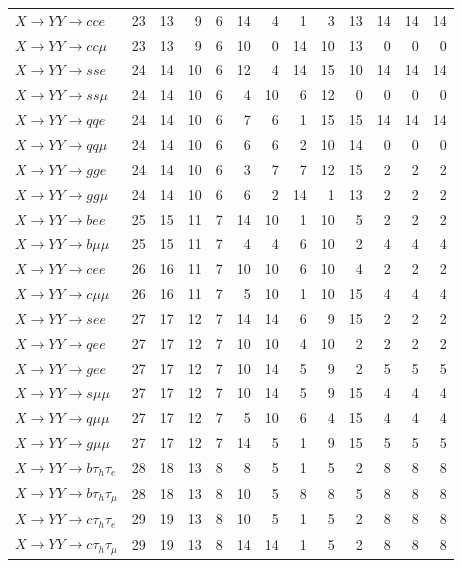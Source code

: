 {\begin{longtable}{l rrrrrrrrrrrr}
$X\to YY\to cce$ & 23 & 13 & 9 & 6 & 14 & 4 & 1 & 3 & 13 & 14 & 14 & 14 \\
$X\to YY\to cc\mu$ & 23 & 13 & 9 & 6 & 10 & 0 & 14 & 10 & 13 & 0 & 0 & 0 \\
$X\to YY\to sse$ & 24 & 14 & 10 & 6 & 12 & 4 & 14 & 15 & 10 & 14 & 14 & 14 \\
$X\to YY\to ss\mu$ & 24 & 14 & 10 & 6 & 4 & 10 & 6 & 12 & 0 & 0 & 0 & 0 \\
$X\to YY\to qqe$ & 24 & 14 & 10 & 6 & 7 & 6 & 1 & 15 & 15 & 14 & 14 & 14 \\
$X\to YY\to qq\mu$ & 24 & 14 & 10 & 6 & 6 & 6 & 2 & 10 & 14 & 0 & 0 & 0 \\
$X\to YY\to gge$ & 24 & 14 & 10 & 6 & 3 & 7 & 7 & 12 & 15 & 2 & 2 & 2 \\
$X\to YY\to gg\mu$ & 24 & 14 & 10 & 6 & 6 & 2 & 14 & 1 & 13 & 2 & 2 & 2 \\
\addlinespace[2pt]
$X\to YY\to bee$ & 25 & 15 & 11 & 7 & 14 & 10 & 1 & 10 & 5 & 2 & 2 & 2 \\
$X\to YY\to b\mu\mu$ & 25 & 15 & 11 & 7 & 4 & 4 & 6 & 10 & 2 & 4 & 4 & 4 \\
$X\to YY\to cee$ & 26 & 16 & 11 & 7 & 10 & 10 & 6 & 10 & 4 & 2 & 2 & 2 \\
$X\to YY\to c\mu\mu$ & 26 & 16 & 11 & 7 & 5 & 10 & 1 & 10 & 15 & 4 & 4 & 4 \\
$X\to YY\to see$ & 27 & 17 & 12 & 7 & 14 & 14 & 6 & 9 & 15 & 2 & 2 & 2 \\
$X\to YY\to qee$ & 27 & 17 & 12 & 7 & 10 & 10 & 4 & 10 & 2 & 2 & 2 & 2 \\
$X\to YY\to gee$ & 27 & 17 & 12 & 7 & 10 & 14 & 5 & 9 & 2 & 5 & 5 & 5 \\
$X\to YY\to s\mu\mu$ & 27 & 17 & 12 & 7 & 10 & 14 & 5 & 9 & 15 & 4 & 4 & 4 \\
$X\to YY\to q\mu\mu$ & 27 & 17 & 12 & 7 & 5 & 10 & 6 & 4 & 15 & 4 & 4 & 4 \\
$X\to YY\to g\mu\mu$ & 27 & 17 & 12 & 7 & 14 & 5 & 1 & 9 & 15 & 5 & 5 & 5 \\
\addlinespace[2pt]
$X\to YY\to b\tau_h\tau_e$ & 28 & 18 & 13 & 8 & 8 & 5 & 1 & 5 & 2 & 8 & 8 & 8 \\
$X\to YY\to b\tau_h\tau_\mu$ & 28 & 18 & 13 & 8 & 10 & 5 & 8 & 8 & 5 & 8 & 8 & 8 \\
$X\to YY\to c\tau_h\tau_e$ & 29 & 19 & 13 & 8 & 10 & 5 & 1 & 5 & 2 & 8 & 8 & 8 \\
$X\to YY\to c\tau_h\tau_\mu$ & 29 & 19 & 13 & 8 & 14 & 14 & 1 & 5 & 2 & 8 & 8 & 8 \\

\end{longtable}}
